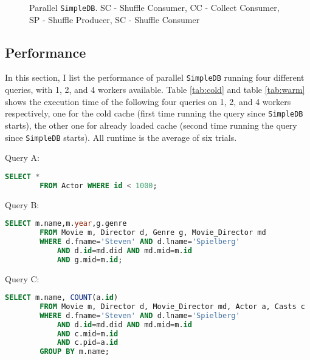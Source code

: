 \documentclass[12pt]{myland}
\def\<#1>{\texttt{#1}}
\begin{document}
\begin{figure}[t!]
        \caption{Parallel \<SimpleDB>. SC - Shuffle Consumer, CC - Collect Consumer, SP - Shuffle Producer, SC - Shuffle
        Consumer}
        \label{fig:para}
    \end{figure}

    \subsection{Performance}
    In this section, I list the performance of parallel \<SimpleDB> running four different queries, with 1, 2, and 4
    workers available. Table \ref{tab:cold} and table \ref{tab:warm} shows the execution time of the following four
    queries on 1, 2, and 4 workers respectively, one for the cold cache (first time running the query since \<SimpleDB>
    starts), the other one for already loaded cache (second time running the query since \<SimpleDB> starts). All runtime
    is the average of six trials.

    Query A:
    \begin{lstlisting}[language=SQL]
    SELECT *
        FROM Actor WHERE id < 1000;
    \end{lstlisting}

    Query B:
    \begin{lstlisting}[language=SQL]
    SELECT m.name,m.year,g.genre
        FROM Movie m, Director d, Genre g, Movie_Director md
        WHERE d.fname='Steven' AND d.lname='Spielberg'
            AND d.id=md.did AND md.mid=m.id
            AND g.mid=m.id;
    \end{lstlisting}

    Query C:
    \begin{lstlisting}[language=SQL]
    SELECT m.name, COUNT(a.id)
        FROM Movie m, Director d, Movie_Director md, Actor a, Casts c
        WHERE d.fname='Steven' AND d.lname='Spielberg'
            AND d.id=md.did AND md.mid=m.id
            AND c.mid=m.id
            AND c.pid=a.id
        GROUP BY m.name;
    \end{lstlisting}
\end{document}
